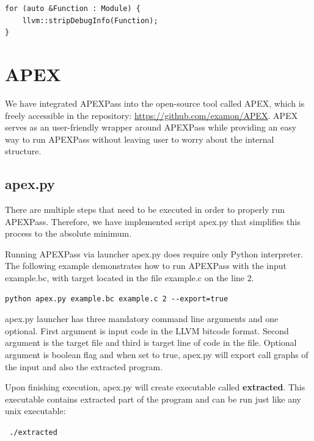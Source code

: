 \documentclass[12pt, twoside]{fithesis2}
\renewcommand{\_}{\leavevmode \kern0.07em\vbox{\hrule width0.4em}}
\begin{document}
\begin{verbatim}
for (auto &Function : Module) {
    llvm::stripDebugInfo(Function);
}
\end{verbatim}

\section{APEX}
\label{sec:impl_launcher}

We have integrated APEXPass into the open-source tool called APEX, which is
freely accessible in the repository: \url{https://github.com/examon/APEX}.
APEX serves as an user-friendly wrapper around APEXPass
while providing an easy way to run APEXPass without leaving user to
worry about the internal structure.

\subsection{apex.py}

There are multiple steps that need to be executed in order to properly
run APEXPass. Therefore, we have implemented script apex.py that simplifies
this process to the absolute minimum.

Running APEXPass via launcher apex.py does require only Python interpreter.
The following example demonstrates how to run APEXPass with the input
example.bc, with target located in the file example.c on the line 2.

\begin{verbatim}
python apex.py example.bc example.c 2 --export=true
\end{verbatim}

apex.py launcher has three mandatory command line arguments and one optional.
First argument is input code in the LLVM bitcode format. Second argument is the
target file and third is target line of code in the file.
Optional argument is boolean flag and when set to true, apex.py will
export call graphs of the input and also the extracted program.

Upon finishing execution, apex.py will create executable called
\textbf{extracted}. This executable contains extracted part of the program and
can be run just like any unix executable:

\texttt{
./extracted
}
\end{document}
